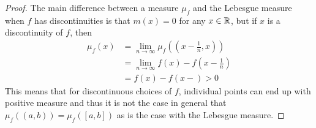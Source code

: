 \documentclass[hw_all.tex]{subfiles}
\begin{document}
\begin{proof}
    The main difference between a measure $\mu_f$ and the Lebesgue measure when $f$ has discontinuities is that $m({x}) = 0$ for any $x \in \mathbb{R}$, but if $x$ is a discontinuity of $f$, then
    \begin{align*}
        \mu_f({x}) &= \lim_{n \to \infty} \mu_f((x - \frac{1}{n}, x)) \\
                   &= \lim_{n \to \infty} f(x) - f(x - \frac{1}{n}) \\
                   &= f(x) - f(x-) > 0
    \end{align*}
    This means that for discontinuous choices of $f$, individual points can end up with positive measure and thus it is not the case in general that $\mu_f((a,b)) = \mu_f([a,b])$ as is the case with the Lebesgue measure.
\end{proof}
\end{document}
